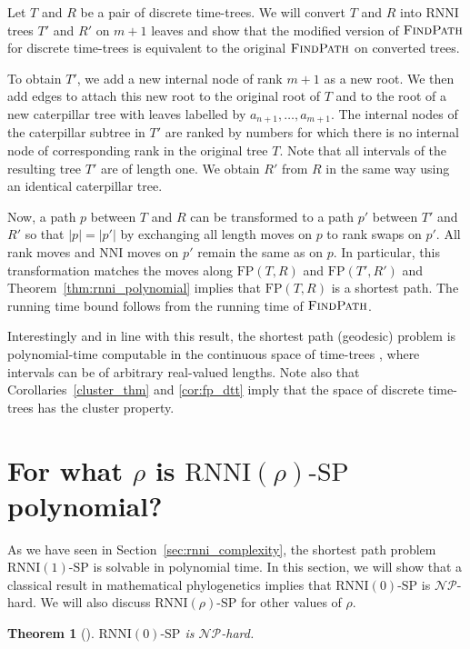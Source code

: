 \documentclass[11pt]{amsart}
\newtheorem{theorem}{Theorem}
\newcommand{\rnni}{\mathrm{RNNI}}
\newcommand{\findpath}{\textsc{FindPath}}
\newcommand{\nni}{\mathrm{NNI}}
\newcommand{\fp}{\mathrm{FP}}
\newcommand{\np}{\mathcal{NP}}
\newcommand{\p}{\mathcal{P}}
\newcommand{\decprob}[1]{\rnni(#1)\text{-}\mathrm{SP}}
\newcommand{\summary}[1]{} %
\begin{document}
\proof
Let $T$ and $R$ be a pair of discrete time-trees.
We will convert $T$ and $R$ into $\rnni$ trees $T'$ and $R'$ on $m + 1$ leaves and show that the modified version of $\findpath$ for discrete time-trees is equivalent to the original $\findpath$ on converted trees.

To obtain $T'$, we add a new internal node of rank $m + 1$ as a new root.
We then add edges to attach this new root to the original root of $T$ and to the root of a new caterpillar tree with leaves labelled by $a_{n + 1}, \ldots, a_{m + 1}$.
The internal nodes of the caterpillar subtree in $T'$ are ranked by numbers for which there is no internal node of corresponding rank in the original tree $T$.
Note that all intervals of the resulting tree $T'$ are of length one.
We obtain $R'$ from $R$ in the same way using an identical caterpillar tree.

Now, a path $p$ between $T$ and $R$ can be transformed to a path $p'$ between $T'$ and $R'$ so that $|p| = |p'|$ by exchanging all length moves on $p$ to rank swaps on $p'$.
All rank moves and $\nni$ moves on $p'$ remain the same as on $p$.
In particular, this transformation matches the moves along $\fp(T,R)$ and $\fp(T',R')$ and Theorem~\ref{thm:rnni_polynomial} implies that $\fp(T, R)$ is a shortest path.
The running time bound follows from the running time of $\findpath$.
\endproof

Interestingly and in line with this result, the shortest path (geodesic) problem is polynomial-time computable in the continuous space of time-trees \autocite{Gavryushkin2016-uu}, where intervals can be of arbitrary real-valued lengths.
Note also that Corollaries~\ref{cluster_thm} and \ref{cor:fp_dtt} imply that the space of discrete time-trees has the cluster property.


\section{For what $\rho$ is $\decprob{\rho}$ polynomial?}

\summary{Summarising results on complexity of $\decprob{\rho}$ -- $\decprob{1} \in \p$ and $\decprob{0} \in \np$}
As we have seen in Section~\ref{sec:rnni_complexity}, the shortest path problem $\decprob{1}$ is solvable in polynomial time.
In this section, we will show that a classical result in mathematical phylogenetics implies that $\decprob{0}$ is $\np$-hard.
We will also discuss $\decprob{\rho}$ for other values of $\rho$.

\begin{theorem}[\textcite{Dasgupta2000-xa}]
$\decprob{0}$ is $\np$-hard.
\label{thm:nni_hard}
\end{theorem}
\end{document}
